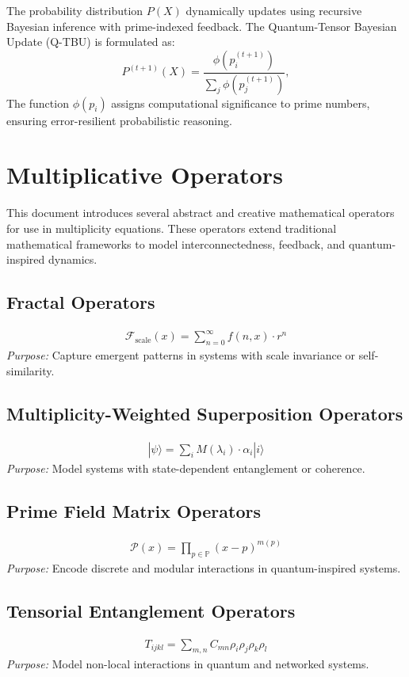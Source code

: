 \documentclass{article}
\theoremstyle{plain}
\begin{document}
\begin{itemize}
The probability distribution $P(X)$ dynamically updates using recursive Bayesian inference with prime-indexed feedback. The Quantum-Tensor Bayesian Update (Q-TBU) is formulated as:
\begin{equation}
    P^{(t+1)}(X) = \frac{\phi(p_i^{(t+1)})}{\sum_{j} \phi(p_j^{(t+1)})},
\end{equation}
The function $\phi(p_i)$ assigns computational significance to prime numbers, ensuring error-resilient probabilistic reasoning. 
\section{Multiplicative Operators}

This document introduces several abstract and creative mathematical operators for use in multiplicity equations. These operators extend traditional mathematical frameworks to model interconnectedness, feedback, and quantum-inspired dynamics.

\subsection{Fractal Operators}
    \begin{align}
        \mathcal{F}_{\text{scale}}(x) = \sum_{n=0}^\infty f(n, x) \cdot r^n
    \end{align}
    \textit{Purpose:} Capture emergent patterns in systems with scale invariance or self-similarity.

    \subsection{Multiplicity-Weighted Superposition Operators}
    \begin{align}
        |\psi\rangle = \sum_i M(\lambda_i) \cdot \alpha_i |i\rangle
    \end{align}
    \textit{Purpose:} Model systems with state-dependent entanglement or coherence.

   \subsection{Prime Field Matrix Operators}
    \begin{align}
        \mathcal{P}(x) = \prod_{p \in \mathbb{P}} (x - p)^{m(p)}
    \end{align}
    \textit{Purpose:} Encode discrete and modular interactions in quantum-inspired systems.

\subsection{Tensorial Entanglement Operators}
    \begin{align}
        T_{ijkl} = \sum_{m,n} C_{mn} \rho_i \rho_j \rho_k \rho_l
    \end{align}
    \textit{Purpose:} Model non-local interactions in quantum and networked systems.


\end{itemize}
\end{document}
